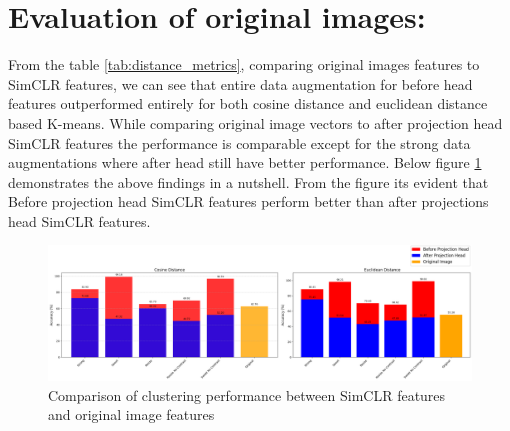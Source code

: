 \section{Evaluation of original images:}
From the table \ref{tab:distance_metrics}, comparing original images features to SimCLR features, we can see that entire data augmentation for  before head features outperformed entirely for both cosine distance and euclidean distance based K-means.
While comparing original image vectors to after projection head SimCLR features the performance is comparable except for the strong data augmentations where after head still have better performance. 
Below figure \ref{fig:cluster} demonstrates the above findings in a nutshell. From the figure its evident that Before projection head SimCLR features perform better than after projections head SimCLR features.
\begin{table}[H]
    \centering
    \caption{Evaluation Results Using Different Distance Metrics for original images}
    \label{tab:distance_metrics}
\end{table}

\begin{figure}[H]
    \centering
    \includegraphics[scale=0.37]{figures/cluster.png} 
    \caption{Comparison of clustering performance between SimCLR features and original image features}
    \label{fig:cluster}
\end{figure}

